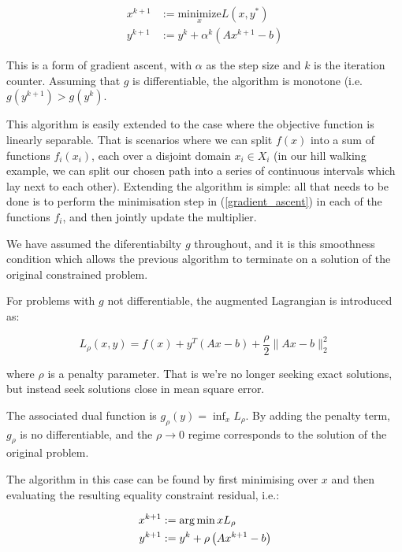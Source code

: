 \documentclass{article}
\begin{document}
\begin{align}
x^{k+1} &:= \underset{x}{\text{minimize}} L\left(x, y^*\right)  \\
y^{k+1} &:= y^{k} + \alpha^k \left(Ax^{k+1} - b\right)
\label{gradient_ascent}
\end{align}

This is a form of gradient ascent, with \( \alpha \) as the step size and \(k\) is the iteration counter. Assuming that \(g\) is differentiable, the algorithm is monotone (i.e. \( g\left(y^{k+1}\right) > g\left(y^{k}\right)\).

This algorithm is easily extended to the case where the objective function is linearly separable. That is scenarios where we can split \(f\left(x\right)\) into a sum of functions \(f_i\left(x_i\right)\), each over a disjoint domain \(x_i \in X_i\) (in our hill walking example, we can split our chosen path into a series of continuous intervals which lay next to each other). Extending the algorithm is simple: all that needs to be done is to perform the minimisation step in (\ref{gradient_ascent}) in each of the functions \(f_i\), and then jointly update the multiplier.

We have assumed the diferentiabilty \(g\) throughout, and it is this smoothness condition which allows the previous algorithm to terminate on a solution of the original constrained problem.

For problems with \(g\) not differentiable, the augmented Lagrangian is introduced as:

\begin{equation}
L_\rho\left(x,y\right) = f\left( x \right) + y^T\left(Ax-b\right) + \frac{\rho}{2}\|Ax-b\|_2^2
\end{equation}

where \(\rho\) is a penalty parameter. That is we're no longer seeking exact solutions, but instead seek solutions close in mean square error. 

The associated dual function is \(g_\rho\left(y\right) = \inf_x L_\rho\). By adding the penalty term, \(g_\rho\) is no differentiable, and the \(\rho \rightarrow 0\) regime corresponds to the solution of the original problem. 

The algorithm in this case can be found by first minimising over \(x\) and then evaluating the resulting equality constraint residual, i.e.:

\begin{align}
x^{k+1} &:= \operatorname*{arg\,min}{x} L_\rho \\
y^{k+1} &:= y^{k} + \rho \left(Ax^{k+1} - b\right)
\label{mom}
\end{align}
\end{document}
